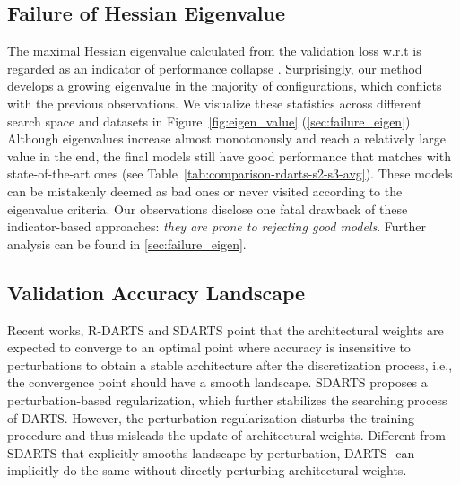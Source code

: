 \documentclass{article} \usepackage{iclr2021_conference,times}
\begin{document}
\subsection{Failure of Hessian Eigenvalue}\label{sec:failure of eigen}
The maximal Hessian eigenvalue calculated from the validation loss w.r.t  is regarded as an indicator of performance collapse \citep{zela2020understanding,chen2020stabilizing}.  Surprisingly, our method develops a growing eigenvalue in the majority of configurations, which conflicts with the previous observations. We visualize these statistics across different search space and datasets in Figure~\ref{fig:eigen_value} (\ref{sec:failure_eigen}).  Although eigenvalues increase almost monotonously and reach a relatively large value in the end, the final models still have good performance that matches with state-of-the-art ones (see Table~\ref{tab:comparison-rdarts-s2-s3-avg}). 
These models can be mistakenly deemed as bad ones or never visited according to the eigenvalue criteria. Our observations disclose one fatal drawback of these indicator-based approaches: \emph{they are prone to rejecting good models}. Further analysis can be found in \ref{sec:failure_eigen}.






\subsection{Validation Accuracy Landscape}

Recent works, R-DARTS \citep{zela2020understanding} and SDARTS \citep{chen2020stabilizing} point that the architectural weights are expected to converge to an optimal point where accuracy is insensitive to perturbations to obtain a stable architecture after the discretization process, i.e., the convergence point should have a smooth landscape. SDARTS  proposes a perturbation-based regularization, which further stabilizes the searching process of DARTS. However, the perturbation regularization disturbs the training procedure and thus misleads the update of architectural weights. 
Different from SDARTS that explicitly smooths landscape by perturbation, DARTS- can implicitly do the same without directly perturbing architectural weights.
\end{document}
